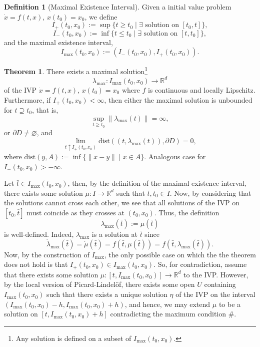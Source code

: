 \documentclass[
]{article}
\theoremstyle{definition}
\newtheorem{theorem}{Theorem}
\theoremstyle{definition}
\newtheorem{definition}{Definition}[section]
\begin{document}
\begin{definition}[Maximal Existence Interval]
  Given a initial value problem \(\dot x = f(t, x)\), \(x(t_0) = x_0\), 
  we define 
  \[I_+(t_0, x_0) := \sup \{t \ge t_0 \mid \exists \text{ solution on } [t_0, t]\},\]
  \[I_-(t_0, x_0) := \inf \{t \le t_0 \mid \exists \text{ solution on } [t, t_0]\},\]
  and the maximal existence interval,
  \[I_{\max} (t_0, x_0) := (I_-(t_0, x_0), I_+(t_0, x_0)).\]
\end{definition}

\begin{theorem}
  There exists a maximal solution\footnote{Any solution is defined on a subset of
  \(I_{\max}(t_0, x_0)\).} 
  \[\lambda_{\max} : I_{\max} (t_0, x_0) \to \mathbb{R}^d\]
  of the IVP \(\dot x = f(t, x)\), \(x(t_0) = x_0\) where \(f\) is continuous 
  and locally Lipschitz. Furthermore, if \(I_+(t_0, x_0) < \infty\), then 
  either the maximal solution is unbounded for \(t \supseteq t_0\), that is,
  \[\sup_{t \ge t_0}\|\lambda_{\max}(t)\| = \infty,\]
  or \(\partial D \neq \varnothing\), and 
  \[\lim_{t \uparrow I_+(t_0, x_0)} \text{dist}((t, \lambda_{\max}(t)), \partial D) = 0,\]
  where \(\text{dist}(y, A) := \inf\{\|x - y\| \mid x \in A\}\).
  Analogous case for \(I_- (t_0, x_0) > -\infty\).
\end{theorem}
\proof

Let \(\bar{t} \in I_{\max}(t_0, x_0)\), then, by the definition of the
maximal existence interval, there exists some solution
\(\mu : I \to \mathbb{R}^d\) such that \(\bar{t}, t_0 \in I\). Now, by
considering that the solutions cannot cross each other, we see that all
solutions of the IVP on \([t_0, \bar{t}]\) must coincide as they crosses
at \((t_0, x_0)\). Thus, the definition
\[\lambda_{\max}(\bar{t}) := \mu(\bar{t})\] is well-defined. Indeed,
\(\lambda_{\max}\) is a solution at \(\bar{t}\) since
\[\dot \lambda_{\max}(\bar{t}) = \dot \mu(\bar{t}) = f(\bar{t}, \mu(\bar{t})) = 
    f(\bar{t}, \lambda_{\max}(\bar{t})).\] Now, by the construction of
\(I_{\max}\), the only possible case on which the the theorem does not
hold is that \(I_+(t_0, x_0) \in I_{\max}(t_0, x_0)\). So, for
contradiction, assume that there exists some solution
\(\mu : [t, I_{\max}(t_0, x_0)] \to \mathbb{R}^d\) to the IVP. However,
by the local version of Picard-Lindelöf, there exists some open \(U\)
containing \(I_{\max}(t_0, x_0)\) such that there exists a unique
solution \(\eta\) of the IVP on the interval
\((I_{\max}(t_0, x_0) - h, I_{\max}(t_0, x_0) + h)\), and hence, we may
extend \(\mu\) to be a solution on \([t, I_{\max}(t_0, x_0) + h]\)
contradicting the maximum condition \#.
\end{document}

